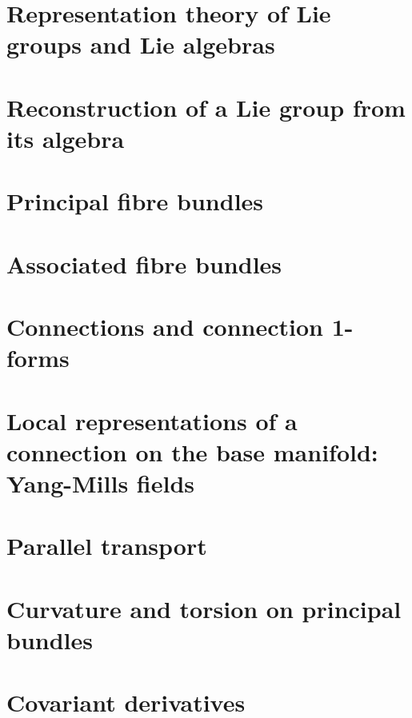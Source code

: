 \documentclass[a4paper,11pt]{article}
\theoremstyle{definition}
\theoremstyle{plain}
\theoremstyle{remark}
\begin{document}
\section{Representation theory of Lie groups and Lie algebras}

\newpage

\section{Reconstruction of a Lie group from its algebra}

\newpage

\section{Principal fibre bundles}

\newpage

\section{Associated fibre bundles}

\newpage

\section{Connections and connection 1-forms}

\newpage

\section{Local representations of a connection on the base manifold: Yang-Mills fields}

\newpage

\section{Parallel transport}

\newpage

\section{Curvature and torsion on principal bundles}

\newpage

\section{Covariant derivatives}

\newpage

\setcounter{section}{25}
\end{document}
